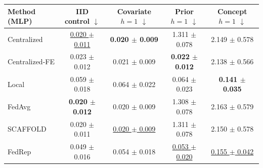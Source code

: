 \begin{tabular}{lcccc}
\toprule
Method (MLP) & IID control $\downarrow$ & Covariate $h=1$ $\downarrow$ & Prior $h=1$ $\downarrow$ & Concept $h=1$ $\downarrow$ \\
\midrule
Centralized & \underline{0.020 $\pm$ 0.011} & \textbf{0.020 $\pm$ 0.009} & 1.311 $\pm$ 0.078 & 2.149 $\pm$ 0.578 \\
Centralized-FE & 0.023 $\pm$ 0.012 & 0.021 $\pm$ 0.009 & \textbf{0.022 $\pm$ 0.012} & 2.138 $\pm$ 0.566 \\
Local & 0.059 $\pm$ 0.018 & 0.064 $\pm$ 0.022 & 0.064 $\pm$ 0.023 & \textbf{0.141 $\pm$ 0.035} \\
FedAvg & \textbf{0.020 $\pm$ 0.012} & 0.020 $\pm$ 0.009 & 1.308 $\pm$ 0.078 & 2.163 $\pm$ 0.579 \\
SCAFFOLD & 0.020 $\pm$ 0.011 & \underline{0.020 $\pm$ 0.009} & 1.311 $\pm$ 0.078 & 2.150 $\pm$ 0.578 \\
FedRep & 0.049 $\pm$ 0.016 & 0.054 $\pm$ 0.018 & \underline{0.053 $\pm$ 0.020} & \underline{0.155 $\pm$ 0.042} \\
\bottomrule
\end{tabular}
